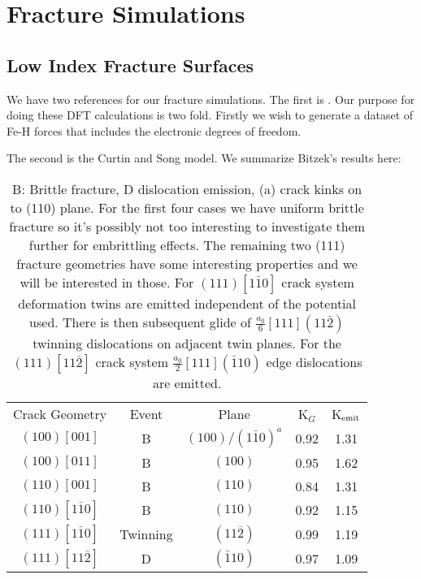 \documentclass{article}
\begin{document}
\section{Fracture Simulations}
\subsection{Low Index Fracture Surfaces}
We have two references for our fracture simulations. The first is \cite{moller14}.
Our purpose for doing these DFT calculations is two fold. Firstly we 
wish to generate a dataset of Fe-H forces that includes the electronic degrees
of freedom.

The second is the Curtin and Song model.
We summarize Bitzek's results here:
%
\begin{table}[!tb]
\begin{tabular}{c c c c c}
\hline
Crack Geometry      & Event     & Plane                    & K$_{G}$ & K$_{\rm emit}$ \\
$(100)[001]$        & B         & $(100)/(1\bar{1}0)^{a}$  &  0.92   &  1.31 \\
$(100)[011]$        & B         & $(100)$                  &  0.95   &  1.62 \\
$(110)[001]$        & B         & $(110)$                  &  0.84   &  1.31 \\
$(110)[1\bar{1}0]$  & B         & $(110)$                  &  0.92   &  1.15 \\
$(111)[1\bar{1}0]$  & Twinning  & $(11\bar{2})$            &  0.99   &  1.19 \\
$(111)[11\bar{2}]$  & D         & $(\bar{1}10)$            &  0.97   &  1.09 \\   
\hline
\hline
\end{tabular}
\caption{B: Brittle fracture, D dislocation emission, (a) crack kinks on to (110) plane.
For the first four cases we have uniform brittle fracture
so it's possibly not too interesting to investigate them further for embrittling
effects. The remaining two (111) fracture geometries have some interesting properties
and we will be interested in those. For $(111)[1\bar{1}0]$ crack system deformation 
twins are emitted independent of the potential used.
There is then subsequent glide of $\frac{a_{0}}{6}[111](11\bar{2})$ twinning
dislocations on adjacent twin planes. For the $(111)[11\bar{2}]$ crack system
$\frac{a_{0}}{2}[111](\bar{1}10)$ edge dislocations are emitted.}
\end{table}
\end{document}
